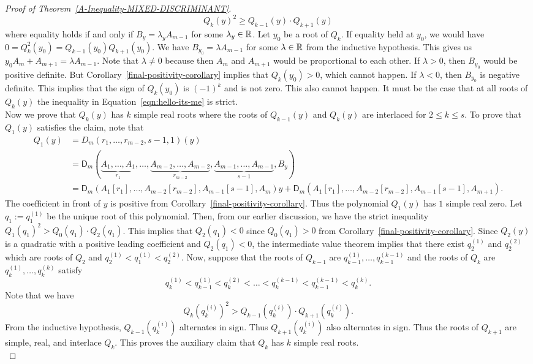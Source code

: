 \documentclass{puthesis-UG}
\begin{document}
\begin{proof}[Proof of Theorem~\ref{A-Inequality-MIXED-DISCRIMINANT}]
	\begin{equation} \label{eqn:hello-its-me}
		Q_k(y)^2 \geq Q_{k-1}(y) \cdot Q_{k+1}(y)
	\end{equation}
	where equality holds if and only if $B_y = \lambda_y A_{m-1}$ for some $\lambda_y \in \mathbb{R}$. Let $y_0$ be a root of $Q_k$. If equality held at $y_0$, we would have $0 = Q_k^2(y_0) = Q_{k-1}(y_0) Q_{k+1}(y_0)$. We have $B_{y_0} = \lambda A_{m-1}$ for some $\lambda \in \mathbb{R}$ from the inductive hypothesis. This gives us $y_0 A_m + A_{m+1} = \lambda A_{m-1}$. Note that $\lambda \neq 0$ because then $A_m$ and $A_{m+1}$ would be proportional to each other. If $\lambda > 0$, then $B_{y_0}$ would be positive definite. But Corollary~\ref{final-positivity-corollary} implies that $Q_k(y_0) > 0$, which cannot happen. If $\lambda < 0$, then $B_{y_0}$ is negative definite. This implies that the sign of $Q_k(y_0)$ is $(-1)^k$ and is not zero. This also cannot happen. It must be the case that at all roots of $Q_k(y)$ the inequality in Equation~\ref{eqn:hello-its-me} is strict. \\

	Now we prove that $Q_k(y)$ has $k$ simple real roots where the roots of $Q_{k-1}(y)$ and $Q_k(y)$ are interlaced for $2 \leq k \leq s$. To prove that $Q_1(y)$ satisfies the claim, note that 
	\begin{align*}
		Q_1(y) & = D_m(r_1, \ldots, r_{m-2}, s-1, 1)(y) \\
		& = \mathsf{D}_m (\underbrace{A_1, \ldots, A_1}_{r_1}, \ldots, \underbrace{A_{m-2}, \ldots, A_{m-2}}_{r_{m-2}}, \underbrace{A_{m-1}, \ldots, A_{m-1}}_{s-1}, B_y) \\
		& = \mathsf{D}_m (A_1[r_1], \ldots, A_{m-2}[r_{m-2}], A_{m-1}[s-1], A_m) y + \mathsf{D}_m (A_1[r_1], \ldots, A_{m-2}[r_{m-2}], A_{m-1}[s-1], A_{m+1}).
	\end{align*}
	The coefficient in front of $y$ is positive from Corollary~\ref{final-positivity-corollary}. Thus the polynomial $Q_1(y)$ has $1$ simple real zero. Let $q_1 := q_1^{(1)}$ be the unique root of this polynomial. Then, from our earlier discussion, we have the strict inequality $Q_1(q_1)^2 > Q_0(q_1) \cdot Q_2(q_1)$. This implies that $Q_2(q_1) < 0$ since $Q_0(q_1) > 0$ from Corollary~\ref{final-positivity-corollary}. Since $Q_2(y)$ is a quadratic with a positive leading coefficient and $Q_2(q_1) < 0$, the intermediate value theorem implies that there exist $q_2^{(1)}$ and $q_2^{(2)}$ which are roots of $Q_2$ and $q_2^{(1)} < q_1^{(1)} < q_2^{(2)}$. Now, suppose that the roots of $Q_{k-1}$ are $q_{k-1}^{(1)}, \ldots, q_{k-1}^{(k-1)}$ and the roots of $Q_k$ are $q_k^{(1)}, \ldots, q_k^{(k)}$ satisfy 
	\[
		q_k^{(1)} < q_{k-1}^{(1)} < q_k^{(2)} < \ldots < q_k^{(k-1)} < q_{k-1}^{(k-1)} < q_k^{(k)}.
	\]
	Note that we have 
	\[
		Q_k(q_k^{(i)})^2 > Q_{k-1}(q_k^{(i)}) \cdot Q_{k+1}(q_k^{(i)}).
	\]
	From the inductive hypothesis, $Q_{k-1}(q_k^{(i)})$ alternates in sign. Thus $Q_{k+1}(q_k^{(i)})$ also alternates in sign. Thus the roots of $Q_{k+1}$ are simple, real, and interlace $Q_k$. This proves the auxiliary claim that $Q_k$ has $k$ simple real roots. \\


\end{proof}
\end{document}
